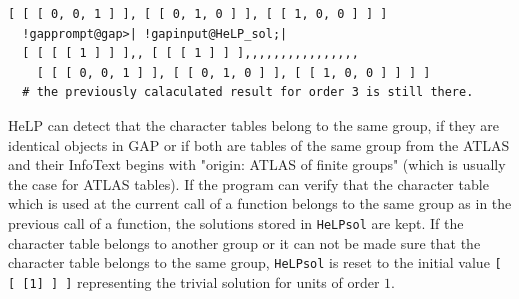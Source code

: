 \documentclass[a4paper,11pt]{report}
\begin{document}
{{\begin{Verbatim}[commandchars=!@|,fontsize=\small,frame=single,label=Example]
  [ [ [ 0, 0, 1 ] ], [ [ 0, 1, 0 ] ], [ [ 1, 0, 0 ] ] ]
  !gapprompt@gap>| !gapinput@HeLP_sol;|
  [ [ [ [ 1 ] ] ],, [ [ [ 1 ] ] ],,,,,,,,,,,,,,,, 
    [ [ [ 0, 0, 1 ] ], [ [ 0, 1, 0 ] ], [ [ 1, 0, 0 ] ] ] ]
  # the previously calaculated result for order 3 is still there.
\end{Verbatim}
 HeLP can detect that the character tables belong to the same group, if they
are identical objects in GAP or if both are tables of the same group from the
ATLAS and their InfoText begins with "origin: ATLAS of finite groups" (which
is usually the case for ATLAS tables). If the program can verify that the
character table which is used at the current call of a function belongs to the
same group as in the previous call of a function, the solutions stored in \texttt{HeLP{\textunderscore}sol} are kept. If the character table belongs to another group or it can not be
made sure that the character table belongs to the same group, \texttt{HeLP{\textunderscore}sol} is reset to the initial value \texttt{[ [ [1] ] ]} representing the trivial solution for units of order $1$.

}}
\end{document}
